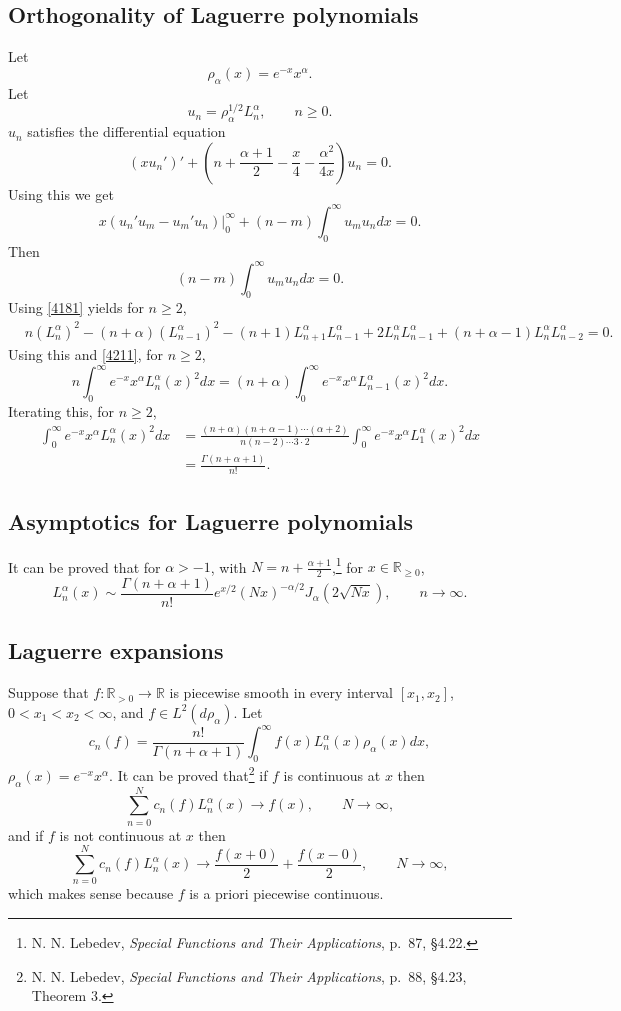 \documentclass{article}
\theoremstyle{definition}
\begin{document}
\subsection{Orthogonality of Laguerre polynomials}
Let
\[
\rho_\alpha(x)=e^{-x} x^\alpha.
\]
Let
\[
u_n = \rho_\alpha^{1/2} L_n^\alpha,\qquad n \geq 0.
\]
$u_n$ satisfies the differential equation 
\[
(xu_n')'+\left(n+\frac{\alpha+1}{2}-\frac{x}{4}-\frac{\alpha^2}{4x}\right) u_n = 0.
\]
Using this we get
\[
x(u_n'u_m-u_m'u_n)\bigg|_0^\infty + (n-m) \int_0^\infty u_m u_n dx = 0.
\]
Then
\begin{equation}
(n-m) \int_0^\infty u_m u_n dx = 0.
\label{4211}
\end{equation}
Using \eqref{4181} yields for $n \geq 2$,
\[
\begin{split}
&n (L_n^\alpha)^2 - (n+\alpha)(L_{n-1}^\alpha)^2-(n+1)L_{n+1}^\alpha L_{n-1}^\alpha
+2L_n^\alpha L_{n-1}^\alpha + (n+\alpha-1)L_n^\alpha L_{n-2}^\alpha=0.
\end{split}
\]
Using this and \eqref{4211}, for $n \geq 2$,
\[
n\int_0^\infty e^{-x} x^\alpha L_n^\alpha(x)^2 dx = (n+\alpha)\int_0^\infty e^{-x} x^\alpha L_{n-1}^\alpha(x)^2 dx.
\]
Iterating this, for $n \geq 2$,
\begin{align*}
\int_0^\infty e^{-x} x^\alpha L_n^\alpha(x)^2 dx &=\frac{(n+\alpha)(n+\alpha-1)\cdots(\alpha+2)}{n(n-2)\cdots 3 \cdot 2} 
\int_0^\infty e^{-x} x^\alpha L_1^\alpha(x)^2 dx\\
&=\frac{\Gamma(n+\alpha+1)}{n!}.
\end{align*}



\subsection{Asymptotics for Laguerre polynomials}
It can be proved that for $\alpha>-1$, with $N=n+\frac{\alpha+1}{2}$,\footnote{N. N. Lebedev,
{\em Special Functions and Their Applications}, p.~87, \S 4.22.} for $x \in \mathbb{R}_{\geq 0}$,
\[
L_n^\alpha(x) \sim \frac{\Gamma(n+\alpha+1)}{n!} e^{x/2} (Nx)^{-\alpha/2} J_\alpha(2\sqrt{Nx}),
\qquad n \to \infty.
\]


\subsection{Laguerre expansions}
Suppose that $f:\mathbb{R}_{>0} \to \mathbb{R}$ is piecewise smooth in every interval
$[x_1,x_2]$, $0<x_1<x_2<\infty$, and 
$f \in L^2(d\rho_\alpha)$. 
Let 
\[
c_n(f) = \frac{n!}{\Gamma(n+\alpha+1)} \int_0^\infty f(x) L_n^\alpha(x) \rho_\alpha(x) dx,
\]
$\rho_\alpha(x)=e^{-x} x^\alpha$.
It can be proved that\footnote{N. N. Lebedev,
{\em Special Functions and Their Applications}, p.~88, \S 4.23, Theorem 3.}
if $f$ is continuous at $x$ then
\[
\sum_{n=0}^N c_n(f) L_n^\alpha(x) \to f(x),\qquad N \to \infty,
\]
and if $f$ is not continuous at $x$ then
\[
\sum_{n=0}^N c_n(f) L_n^\alpha(x) \to \frac{f(x+0)}{2}+\frac{f(x-0)}{2},\qquad N \to \infty,
\]
which makes sense because $f$ is a priori piecewise continuous.
\end{document}
